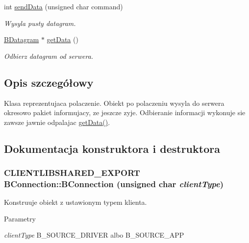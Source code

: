 \begin{DoxyCompactItemize}
int \hyperlink{class_b_connection_ae6e720ac6a03bd3672ab440eb1e9b8c5}{sendData} (unsigned char command)
\begin{DoxyCompactList}\small\item\em Wysyla pusty datagram. \item\end{DoxyCompactList}\item 
\hyperlink{class_b_datagram}{BDatagram} $\ast$ \hyperlink{class_b_connection_a68fb4ff5ee98e5228378d08a2fe2ae19}{getData} ()
\begin{DoxyCompactList}\small\item\em Odbierz datagram od serwera. \item\end{DoxyCompactList}\end{DoxyCompactItemize}


\subsection{Opis szczegółowy}
Klasa reprezentujaca polaczenie. Obiekt po polaczeniu wysyla do serwera okresowo pakiet informujacy, ze jeszcze zyje. Odbieranie informacji wykonuje sie zawsze jawnie odpalajac \hyperlink{class_b_connection_a68fb4ff5ee98e5228378d08a2fe2ae19}{getData()}. 

\subsection{Dokumentacja konstruktora i destruktora}
\hypertarget{class_b_connection_ac9dfcf1eed50d5ac3636cb2256b208e9}{
\subsubsection[{BConnection}]{\setlength{\rightskip}{0pt plus 5cm}CLIENTLIBSHARED\_\-EXPORT BConnection::BConnection (unsigned char {\em clientType})}}
\label{class_b_connection_ac9dfcf1eed50d5ac3636cb2256b208e9}


Konstruuje obiekt z ustawionym typem klienta. 
\begin{DoxyParams}{Parametry}
\item[{\em clientType}]B\_\-SOURCE\_\-DRIVER albo B\_\-SOURCE\_\-APP \end{DoxyParams}


